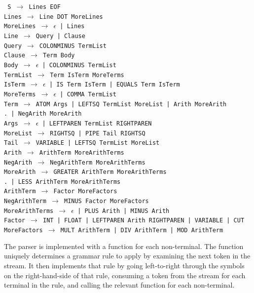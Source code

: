 \documentclass[12pt]{article}
\begin{document}
\texttt{
S $\rightarrow$ Lines EOF\\
Lines $\rightarrow$ Line DOT MoreLines\\
MoreLines $\rightarrow$ $\epsilon$ | Lines\\
Line $\rightarrow$ Query | Clause\\
Query $\rightarrow$ COLONMINUS TermList\\
Clause $\rightarrow$ Term Body\\
Body $\rightarrow$ $\epsilon$ | COLONMINUS TermList\\
TermList $\rightarrow$ Term IsTerm MoreTerms\\
IsTerm $\rightarrow$ $\epsilon$ | IS Term IsTerm | EQUALS Term IsTerm\\
MoreTerms $\rightarrow$ $\epsilon$ | COMMA TermList\\
Term $\rightarrow$ ATOM Args | LEFTSQ TermList MoreList | Arith MoreArith\\
.\hspace{20px} | NegArith MoreArith \\
Args $\rightarrow$ $\epsilon$ | LEFTPAREN TermList RIGHTPAREN\\
MoreList $\rightarrow$ RIGHTSQ | PIPE Tail RIGHTSQ\\
Tail $\rightarrow$ VARIABLE | LEFTSQ TermList MoreList\\
Arith $\rightarrow$ ArithTerm MoreArithTerms\\
NegArith $\rightarrow$ NegArithTerm MoreArithTerms\\
MoreArith $\rightarrow$ GREATER ArithTerm MoreArithTerms\\
.\hspace{50px} | LESS ArithTerm MoreArithTerms \\
ArithTerm $\rightarrow$ Factor MoreFactors\\
NegArithTerm $\rightarrow$ MINUS Factor MoreFactors\\
MoreArithTerms $\rightarrow$ $\epsilon$ | PLUS Arith | MINUS Arith\\
Factor $\rightarrow$ INT | FLOAT | LEFTPAREN Arith RIGHTPAREN | VARIABLE | CUT\\
MoreFactors $\rightarrow$ MULT ArithTerm | DIV ArithTerm | MOD ArithTerm
}

The parser is implemented with a function for each non-terminal. 
The function uniquely determines a grammar rule to apply by examining the next token in the stream. 
It then implements that rule by going left-to-right through the symbols on the right-hand-side of that rule, consuming a token from the stream for each terminal in the rule, and calling the relevant function for each non-terminal.
\end{document}
